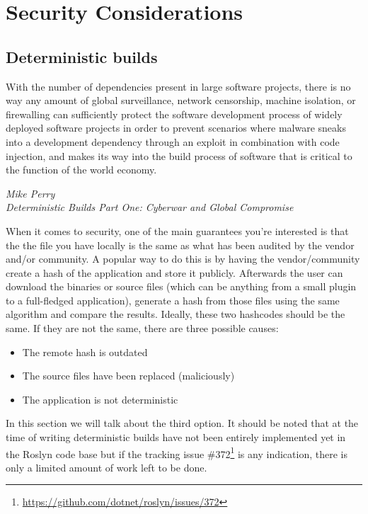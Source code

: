 \section{Security Considerations}
\label{sec:security}

\subsection{Deterministic builds}
\label{sec:deterministic-builds}

\epigraph{With the number of dependencies present in large software projects, there is no way any amount of global surveillance, network censorship, machine isolation, or firewalling can sufficiently protect the software development process of widely deployed software projects in order to prevent scenarios where malware sneaks into a development dependency through an exploit in combination with code injection, and makes its way into the build process of software that is critical to the function of the world economy.}
{\textit{Mike Perry \\ \footnotesize{Deterministic Builds Part One: Cyberwar and Global Compromise\protect\footnotemark}}}


When it comes to security, one of the main guarantees you're interested is that the the file you have locally is the same as what has been audited by the vendor and/or community. A popular way to do this is by having the vendor/community create a hash of the application and store it publicly. Afterwards the user can download the binaries or source files (which can be anything from a small plugin to a full-fledged application), generate a hash from those files using the same algorithm and compare the results. Ideally, these two hashcodes should be the same. If they are not the same, there are three possible causes:

\begin{itemize}
\item The remote hash is outdated
\item The source files have been replaced (maliciously)
\item The application is not deterministic
\end{itemize}

In this section we will talk about the third option. It should be noted that at the time of writing deterministic builds have not been entirely implemented yet in the Roslyn code base but if the tracking issue \#372\footnote{\url{https://github.com/dotnet/roslyn/issues/372}} is any indication, there is only a limited amount of work left to be done.

